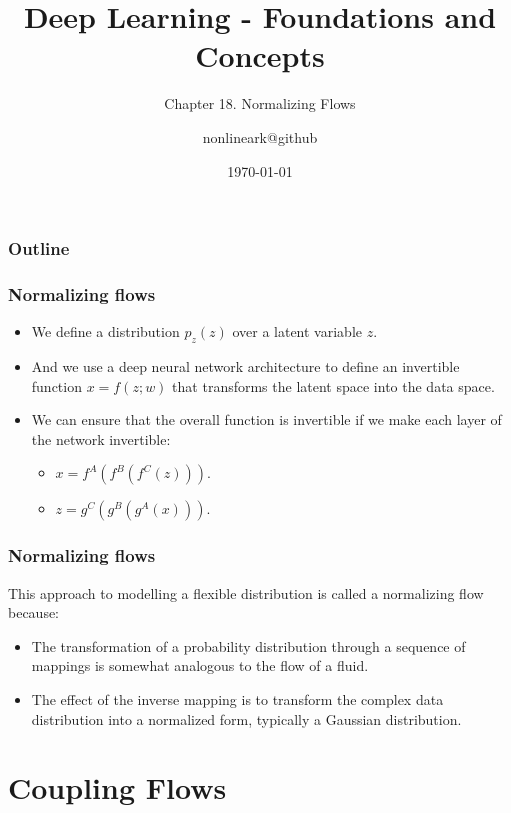 \documentclass{beamer}
\title{Deep Learning - Foundations and Concepts}
\subtitle{Chapter 18. Normalizing Flows}
\author{nonlineark@github}
\date{\today}
\begin{document}
\begin{frame}
    \titlepage
\end{frame}

\begin{frame}
    \frametitle{Outline}
    \tableofcontents
\end{frame}

\begin{frame}
    \frametitle{Normalizing flows}
    \begin{itemize}
        \item We define a distribution $p_{z}(z)$ over a latent variable $z$.
        \item And we use a deep neural network architecture to define an invertible function $x=f(z;w)$ that transforms the latent space into the data space.
        \item We can ensure that the overall function is invertible if we make each layer of the network invertible:
        \begin{itemize}
            \item $x=f^{A}(f^{B}(f^{C}(z)))$.
            \item $z=g^{C}(g^{B}(g^{A}(x)))$.
        \end{itemize}
    \end{itemize}
\end{frame}

\begin{frame}
    \frametitle{Normalizing flows}
    This approach to modelling a flexible distribution is called a normalizing flow because:
    \begin{itemize}
        \item The transformation of a probability distribution through a sequence of mappings is somewhat analogous to the flow of a fluid.
        \item The effect of the inverse mapping is to transform the complex data distribution into a normalized form, typically a Gaussian distribution.
    \end{itemize}
\end{frame}

\section{Coupling Flows}
\end{document}
